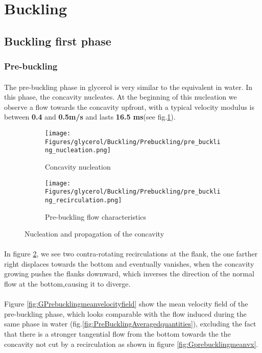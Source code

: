 \documentclass[a4paper,10pt]{report}
\begin{document}
\section{Buckling}
\subsection{Buckling first phase}
\subsubsection{Pre-buckling}
\paragraph{}
The pre-buckling phase in glycerol is very similar to the equivalent in water.
In this phase, the concavity nucleates. At the beginning of this nucleation we observe a flow towards the concavity upfront, with a typical velocity modulus is 
between \textbf{0.4} and \textbf{0.5m/s} and lasts \textbf{16.5 ms}(see fig.\ref{fig:GConcavityNucleationflowcharacteristics}).
\begin{figure}[htbp]%
	\centering%
	 \begin{subfigure}[h]{0.5\textwidth}%
        \texttt{[image: Figures/glycerol/Buckling/Prebuckling/pre\_buckling\_nucleation.png]}%
        \caption{Concavity nucleation}%
				\label{fig:GConcavityNucleationflowcharacteristics}%
    \end{subfigure}%
    \begin{subfigure}[h]{0.5\linewidth}%
        \texttt{[image: Figures/glycerol/Buckling/Prebuckling/pre\_buckling\_recirculation.png]}%
        \caption{Pre-buckling flow characteristics}%
        \label{fig:GPrebuckling}%
    \end{subfigure}%
		\caption{Nucleation and propagation of the concavity}%
		\label{fig:GPrebucklingflowcharacteristics}%
\end{figure}
\paragraph{}
In figure \ref{fig:GPrebuckling}, we see two contra-rotating recirculations at the flank, the one  farther right displaces towards the bottom and eventually vanishes, when the concavity growing pushes the flanks downward, which inverses the direction of the normal flow at the bottom,causing it to diverge.
\paragraph{}
Figure \ref{fig:GPrebucklingmeanvelocityfield} show the mean velocity field of the pre-buckling phase, which looks comparable with the flow induced during the same phase in water (fig.\ref{fig:PreBucklingAveragedquantities}), excluding the fact that there is a stronger tangential flow from the bottom towards the the concavity not cut by a recirculation as shown in figure \ref{fig:Gprebucklingmeanvx}.
\end{document}
